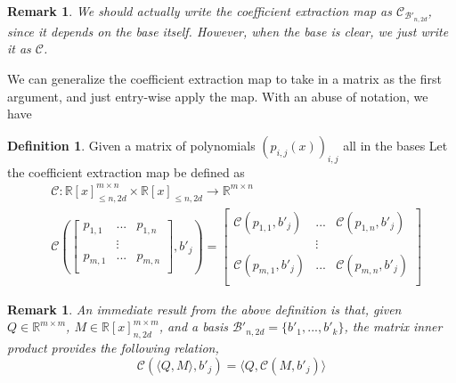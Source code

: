 \documentclass[12pt]{amsart}
\numberwithin{equation}{section}
\newtheorem{remark}[thm]{Remark}
\theoremstyle{definition}
\newtheorem{definition}[thm]{Definition}
\numberwithin{thm}{section}
\begin{document}
\begin{remark}
     We should actually write the {coefficient extraction map} as $\mathcal{C}_{\mathcal{B'}_{n,2d}}$,
     since it depends on the base itself. However, when the base is clear, we just write it as $\mathcal{C}$.
\end{remark}

\smallskip 
We can generalize the {coefficient extraction map} to take in a matrix as the first argument, and just entry-wise apply the map. With an abuse of notation, we have 
\begin{definition}
     Given a matrix of polynomials $(p_{i, j}(x))_{i, j}$ all in the bases Let the {coefficient extraction map} be defined as 
     \begin{equation*}
          \begin{split}
               & \mathcal{C}: \mathbb{R}[x]_{\leq n, 2d}^{m \times n} \times \mathbb{R}[x]_{\leq n, 2d} \rightarrow \mathbb{R}^{m \times n} \\
               & \mathcal{C}(
                    \begin{bmatrix} 
                         p_{1, 1} & ... & p_{1, n} \\
                         & \vdots \\
                         p_{m, 1} & ... & p_{m, n} \\
                    \end{bmatrix}, b'_j
               ) = \begin{bmatrix} 
                    \mathcal{C}(p_{1, 1}, b'_j) & ... &  \mathcal{C}(p_{1, n}, b'_j) \\
                    & \vdots \\
                    \mathcal{C}(p_{m, 1}, b'_j) & ... &  \mathcal{C}(p_{m, n}, b'_j) \\
                    \end{bmatrix}
          \end{split}
     \end{equation*}
\end{definition}

\begin{remark}
     An immediate result from the above definition is that, given $Q \in \mathbb{R}^{m \times m}$, $M \in \mathbb{R}[x]_{n, 2d}^{m \times m}$, 
     and a basis $\mathcal{B}'_{n, 2d} = \{b'_1, ..., b'_k\}$, the matrix inner product provides the following relation,
     \begin{equation*}
          \mathcal{C}(\langle Q, M \rangle, b'_j) = \langle Q, \mathcal{C}(M, b'_j) \rangle
     \end{equation*}
\end{remark}
\end{document}
